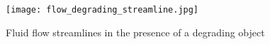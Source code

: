 \begin{figure}[h]
\centering
\medskip
\texttt{[image: flow\_degrading\_streamline.jpg]}
\caption[Fluid flow streamlines in the presence of a degrading object]{Fluid flow streamlines in the presence of a degrading object} \label{fig:fluid_flow_degrading_streamline}
\end{figure}
















\cleardoublepage

